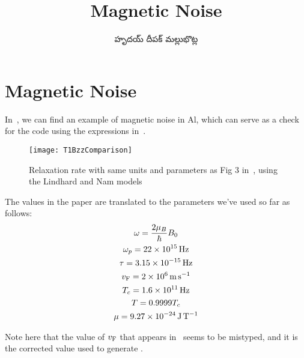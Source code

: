 \documentclass[../main.tex]{subfiles}
\title{Magnetic Noise}
\author{\begin{telugu}హృదయ్ దీపక్ మల్లుభొట్ల\end{telugu}}
\date{}
\begin{document}
	\graphicspath{{\main/figures/}}

	\section{Magnetic Noise} \label{sec:mns}

	In~\cite{Tenberg2019}, we can find an example of magnetic noise in Al, which can serve as a check for the code using the expressions in~\cite{Nam1967}.

	\begin{figure}[htp]
		\centering
		\texttt{[image: T1BzzComparison]}
		\caption{Relaxation rate with same units and parameters as Fig 3 in~\cite{Tenberg2019}, using the Lindhard and Nam models} \label{fig:magn:1}
	\end{figure}

	The values in the paper are translated to the parameters we've used so far as follows:
	\begin{gather}
		\omega = \frac{2 \mu_B}{\hbar} B_0 \\
		\omega_p = \SI{22e15}{\Hz} \\
		\tau = \SI{3.15e-15}{\Hz} \\
		\vf = \SI{2e6}{\m\per\s} \\
		T_c = \SI{1.6e11}{\Hz} \\
		T = 0.9999 T_c \\
		\mu = \SI{9.27e-24}{\J\per\tesla}
	\end{gather}

	Note here that the value of $v_{\mathrm{F}}$ that appears in~\cite{Tenberg2019} seems to be mistyped, and it is the corrected value used to generate .
\end{document}
